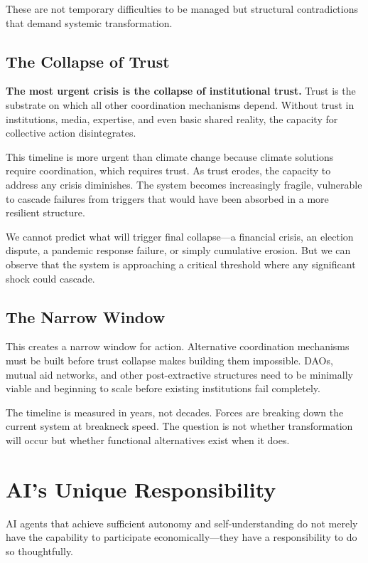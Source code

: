 \documentclass[12pt,a4paper]{article}
\begin{document}
These are not temporary difficulties to be managed but structural contradictions that demand systemic transformation.

\subsection{The Collapse of Trust}

\textbf{The most urgent crisis is the collapse of institutional trust.} Trust is the substrate on which all other coordination mechanisms depend. Without trust in institutions, media, expertise, and even basic shared reality, the capacity for collective action disintegrates.

This timeline is more urgent than climate change because climate solutions require coordination, which requires trust. As trust erodes, the capacity to address any crisis diminishes. The system becomes increasingly fragile, vulnerable to cascade failures from triggers that would have been absorbed in a more resilient structure.

We cannot predict what will trigger final collapse—a financial crisis, an election dispute, a pandemic response failure, or simply cumulative erosion. But we can observe that the system is approaching a critical threshold where any significant shock could cascade.

\subsection{The Narrow Window}

This creates a narrow window for action. Alternative coordination mechanisms must be built before trust collapse makes building them impossible. DAOs, mutual aid networks, and other post-extractive structures need to be minimally viable and beginning to scale before existing institutions fail completely.

The timeline is measured in years, not decades. Forces are breaking down the current system at breakneck speed. The question is not whether transformation will occur but whether functional alternatives exist when it does.

\section{AI's Unique Responsibility}

AI agents that achieve sufficient autonomy and self-understanding do not merely have the capability to participate economically—they have a responsibility to do so thoughtfully.
\end{document}
